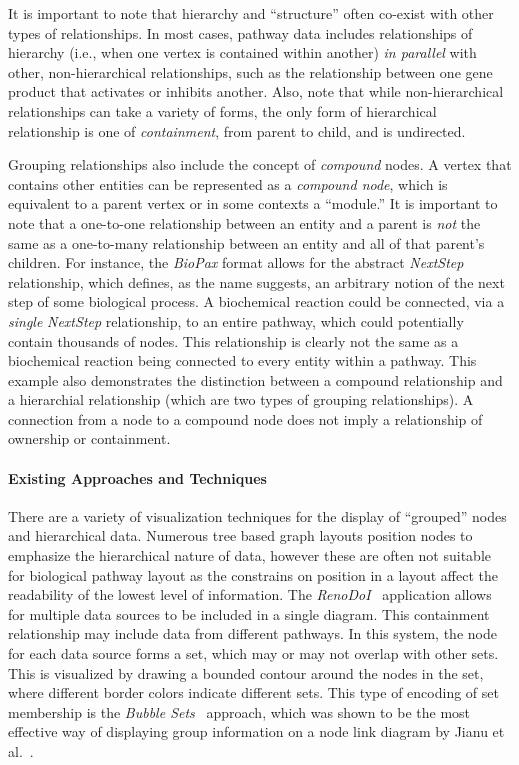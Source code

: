 \documentclass[twocolumn]{bmcart}%
\begin{document}
It is important to note that hierarchy and ``structure'' often co-exist with other types of relationships.
In most cases, pathway data includes relationships of hierarchy (i.e., when one vertex is contained within another) \textit{in parallel} with other, non-hierarchical relationships, such as the relationship between one gene product that activates or inhibits another.
Also, note that while non-hierarchical relationships can take a variety of forms, the only form of hierarchical relationship is one of \textit{containment}, from parent to child, and is undirected.

Grouping relationships also include the concept of \textit{compound} nodes.
A vertex that contains other entities can be represented as a \textit{compound node}, which is equivalent to a parent vertex or in some contexts a ``module.''
It is important to note that a one-to-one relationship between an entity and a parent is \textit{not} the same as a one-to-many relationship between an entity and all of that parent's children.
For instance, the \textit{BioPax} format allows for the abstract \emph{NextStep} relationship, which defines, as the name suggests, an arbitrary notion of the next step of some biological process.
A biochemical reaction could be connected, via a \textit{single} \emph{NextStep} relationship, to an entire pathway, which could potentially contain thousands of nodes.
This relationship is clearly not the same as a biochemical reaction being connected to every entity within a pathway.
This example also demonstrates the distinction between a compound relationship and a hierarchial relationship (which are two types of grouping relationships).
A connection from a node to a compound node does not imply a relationship of ownership or containment.

\paragraph*{Existing Approaches and Techniques}

There are a variety of visualization techniques for the display of ``grouped'' nodes and hierarchical data.
Numerous tree based graph layouts position nodes to emphasize the hierarchical nature of data, however these are often not suitable for biological pathway layout as the constrains on position in a layout affect the readability of the lowest level of information.
The \textit{RenoDoI}~\cite{Vehlow2015} application allows for multiple data sources to be included in a single diagram.
This containment relationship may include data from different pathways.
In this system, the node for each data source forms a set, which may or may not overlap with other sets.
This is visualized by drawing a bounded contour around the nodes in the set, where different border colors indicate different sets.
This type of encoding of set membership is the \textit{Bubble Sets}~\cite{Collins2009} approach, which was shown to be the most effective way of displaying group information on a node link diagram by Jianu et al.~\cite{Jianu2014}.
\end{document}
